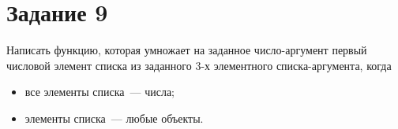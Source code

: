
\section{Задание 9}
Написать функцию, которая умножает на заданное число-аргумент первый числовой элемент списка из заданного 3-х элементного списка-аргумента, когда
\begin{itemize}
	\item все элементы списка~--- числа;
	\item элементы списка~--- любые объекты.
\end{itemize}

